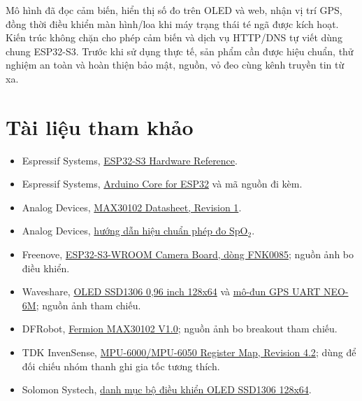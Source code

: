 \documentclass[12pt]{article}
\begin{document}
Mô hình đã đọc cảm biến, hiển thị số đo trên OLED và web, nhận vị trí GPS, đồng thời điều khiển màn hình/loa khi máy trạng thái té ngã được kích hoạt. Kiến trúc không chặn cho phép cảm biến và dịch vụ HTTP/DNS tự viết dùng chung ESP32-S3. Trước khi sử dụng thực tế, sản phẩm cần được hiệu chuẩn, thử nghiệm an toàn và hoàn thiện bảo mật, nguồn, vỏ đeo cùng kênh truyền tin từ xa.

\section*{Tài liệu tham khảo}

\begin{itemize}
  \item Espressif Systems, \href{https://docs.espressif.com/projects/esp-idf/en/stable/esp32s3/hw-reference/index.html}{ESP32-S3 Hardware Reference}.
  \item Espressif Systems, \href{https://github.com/espressif/arduino-esp32}{Arduino Core for ESP32} và mã nguồn  đi kèm.
  \item Analog Devices, \href{https://www.analog.com/media/en/technical-documentation/data-sheets/MAX30102.pdf}{MAX30102 Datasheet, Revision 1}.
  \item Analog Devices, \href{https://www.analog.com/en/resources/technical-articles/guidelines-for-spo2-measurement--maxim-integrated.html}{hướng dẫn hiệu chuẩn phép đo SpO$_2$}.
  \item Freenove, \href{https://store.freenove.com/products/fnk0085}{ESP32-S3-WROOM Camera Board, dòng FNK0085}; nguồn ảnh bo điều khiển.
  \item Waveshare, \href{https://www.waveshare.com/0.96inch-OLED-A.htm}{OLED SSD1306 0,96 inch 128x64} và \href{https://www.waveshare.com/uart-gps-neo-6m.htm}{mô-đun GPS UART NEO-6M}; nguồn ảnh tham chiếu.
  \item DFRobot, \href{https://wiki.dfrobot.com/sen0344/docs/19237}{Fermion MAX30102 V1.0}; nguồn ảnh bo breakout tham chiếu.
  \item TDK InvenSense, \href{https://invensense.tdk.com/wp-content/uploads/2015/02/MPU-6000-Register-Map.pdf}{MPU-6000/MPU-6050 Register Map, Revision 4.2}; dùng để đối chiếu nhóm thanh ghi gia tốc tương thích.
  \item Solomon Systech, \href{https://www.solomon-systech.com/product-category/oled-display}{danh mục bộ điều khiển OLED SSD1306 128x64}.
\end{itemize}
\end{document}
